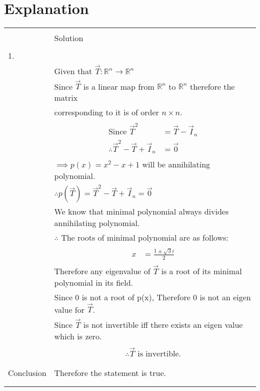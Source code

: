 \documentclass[journal,12pt]{IEEEtran}
\begin{document}
\section{\textbf{Explanation}}
\renewcommand{\thetable}{2}
\begin{longtable}{|l|l|}
\hline
\multirow{3}{*}{} & \\
Statement&Solution\\
\hline
&\\
1.&\\
&Given that $\vec{T}:\mathbb{R}^n \rightarrow \mathbb{R}^n$\\
&Since $\vec{T}$ is a linear map from $\mathbb{R}^n$ to $\mathbb{R}^n$ therefore the matrix\\
&corresponding to it is of order $n \times n$.\\
&\parbox{6cm}{\begin{align*}
    \mbox{Since }\vec{T}^2&=\vec{T}-\vec{I}_{n}\\
    \therefore\vec{T}^2-\vec{T}+\vec{I}_{n}&=\vec{0}
\end{align*}}\\
&$\implies p(x)=x^2-x+1$ will be annihilating polynomial.\\
&$\therefore p(\vec{T})=\vec{T}^2-\vec{T}+\vec{I}_{n}=\vec{0}$\\
&We know that minimal polynomial always divides annihilating polynomial.\\
&$\therefore$ The roots of minimal polynomial are as follows:\\
&\parbox{6cm}{\begin{align}
    x&=\frac{1\pm\sqrt{3}i}{2}\label{eq:root}
\end{align}}\\
&Therefore any eigenvalue of $\vec{T}$ is a root of its minimal polynomial in its field.\\
&Since 0 is not a root of p(x), Therefore 0 is not an eigen value for $\vec{T}$.\\
&Since $\vec{T}$ is not invertible iff there exists an eigen value which is zero.\\
&\parbox{6cm}{\begin{align}
    \therefore\vec{T}\mbox{ is invertible.}
\end{align}}\\
&\\
\hline
&\\
Conclusion&Therefore the statement is true.\\
&\\
\hline
&\\

\end{longtable}
\end{document}
